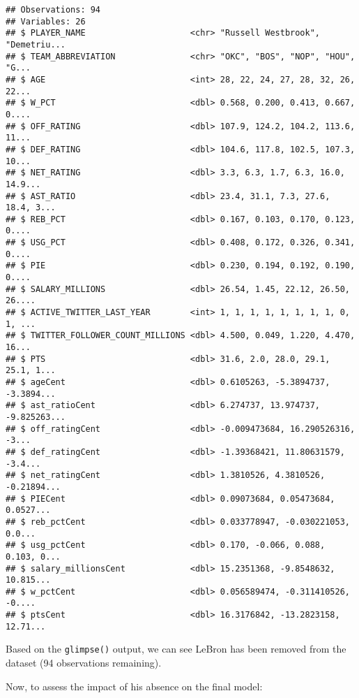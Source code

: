 \documentclass[]{article}
\begin{document}
\begin{verbatim}
## Observations: 94
## Variables: 26
## $ PLAYER_NAME                     <chr> "Russell Westbrook", "Demetriu...
## $ TEAM_ABBREVIATION               <chr> "OKC", "BOS", "NOP", "HOU", "G...
## $ AGE                             <int> 28, 22, 24, 27, 28, 32, 26, 22...
## $ W_PCT                           <dbl> 0.568, 0.200, 0.413, 0.667, 0....
## $ OFF_RATING                      <dbl> 107.9, 124.2, 104.2, 113.6, 11...
## $ DEF_RATING                      <dbl> 104.6, 117.8, 102.5, 107.3, 10...
## $ NET_RATING                      <dbl> 3.3, 6.3, 1.7, 6.3, 16.0, 14.9...
## $ AST_RATIO                       <dbl> 23.4, 31.1, 7.3, 27.6, 18.4, 3...
## $ REB_PCT                         <dbl> 0.167, 0.103, 0.170, 0.123, 0....
## $ USG_PCT                         <dbl> 0.408, 0.172, 0.326, 0.341, 0....
## $ PIE                             <dbl> 0.230, 0.194, 0.192, 0.190, 0....
## $ SALARY_MILLIONS                 <dbl> 26.54, 1.45, 22.12, 26.50, 26....
## $ ACTIVE_TWITTER_LAST_YEAR        <int> 1, 1, 1, 1, 1, 1, 1, 1, 0, 1, ...
## $ TWITTER_FOLLOWER_COUNT_MILLIONS <dbl> 4.500, 0.049, 1.220, 4.470, 16...
## $ PTS                             <dbl> 31.6, 2.0, 28.0, 29.1, 25.1, 1...
## $ ageCent                         <dbl> 0.6105263, -5.3894737, -3.3894...
## $ ast_ratioCent                   <dbl> 6.274737, 13.974737, -9.825263...
## $ off_ratingCent                  <dbl> -0.009473684, 16.290526316, -3...
## $ def_ratingCent                  <dbl> -1.39368421, 11.80631579, -3.4...
## $ net_ratingCent                  <dbl> 1.3810526, 4.3810526, -0.21894...
## $ PIECent                         <dbl> 0.09073684, 0.05473684, 0.0527...
## $ reb_pctCent                     <dbl> 0.033778947, -0.030221053, 0.0...
## $ usg_pctCent                     <dbl> 0.170, -0.066, 0.088, 0.103, 0...
## $ salary_millionsCent             <dbl> 15.2351368, -9.8548632, 10.815...
## $ w_pctCent                       <dbl> 0.056589474, -0.311410526, -0....
## $ ptsCent                         <dbl> 16.3176842, -13.2823158, 12.71...
\end{verbatim}

Based on the \texttt{glimpse()} output, we can see LeBron has been
removed from the dataset (94 observations remaining).

Now, to assess the impact of his absence on the final model:
\end{document}
